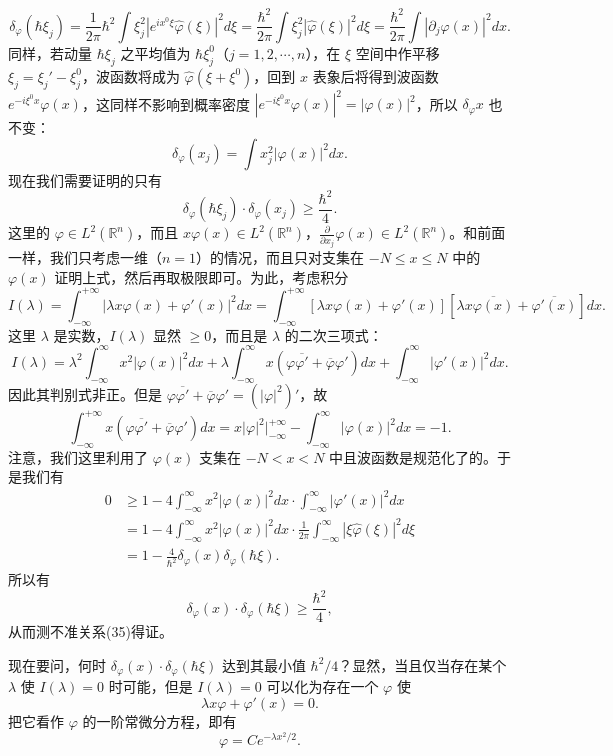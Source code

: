 \[
 \delta_\varphi(\hbar\xi_j)
 =\frac1{2\pi}\hbar^2\int\xi_j^2|e^{ix^0\xi}\widehat\varphi(\xi)|^2d\xi
 =\frac{\hbar^2}{2\pi}\int\xi_j^2|\widehat\varphi(\xi)|^2d\xi
 =\frac{\hbar^2}{2\pi}\int|\partial_j\varphi(x)|^2dx.
\]
同样，若动量 $\hbar\xi_j$ 之平均值为 $\hbar\xi_j^0$（$j=1,2,\cdots,n$），在 $\xi$ 空间中作平移 $\xi_j=\xi_j'-\xi_j^0$，波函数将成为 $\widehat\varphi(\xi+\xi^0)$，回到 $x$ 表象后将得到波函数 $e^{-i\xi^0x}\varphi(x)$，这同样不影响到概率密度 $|e^{-i\xi^0x}\varphi(x)|^2=|\varphi(x)|^2$，所以 $\delta_\varphi x$ 也不变：
\[
 \delta_\varphi(x_j)=\int x_j^2|\varphi(x)|^2dx.
\]
现在我们需要证明的只有
\[
 \delta_\varphi(\hbar\xi_j)\cdot\delta_\varphi(x_j)\ge\frac{\hbar^2}{4}.
\]
这里的 $\varphi\in L^2(\mathbb R^n)$，而且 $x\varphi(x)\in L^2(\mathbb R^n)$，$\frac\partial{\partial x_j}\varphi(x)\in L^2(\mathbb R^n)$。和前面一样，我们只考虑一维（$n=1$）的情况，而且只对支集在 $-N\le x\le N$ 中的 $\varphi(x)$ 证明上式，然后再取极限即可。为此，考虑积分
\[
 I(\lambda)=\int_{-\infty}^{+\infty}|\lambda x\varphi(x)+\varphi'(x)|^2dx
 =\int_{-\infty}^{+\infty}[\lambda x\varphi(x)+\varphi'(x)]
 [\lambda x\overline{\varphi(x)}+\overline{\varphi'(x)}]dx.
\]
这里 $\lambda$ 是实数，$I(\lambda)$ 显然 $\ge0$，而且是 $\lambda$ 的二次三项式：
\[
 I(\lambda)=\lambda^2\int_{-\infty}^{\infty}x^2|\varphi(x)|^2dx
 +\lambda\int_{-\infty}^{\infty}x(\varphi\overline{\varphi'}+\overline\varphi\varphi')dx
 +\int_{-\infty}^{\infty}|\varphi'(x)|^2dx.
\]
因此其判别式非正。但是 $\varphi\overline{\varphi'}+\overline\varphi\varphi'=(|\varphi|^2)'$，故
\[
 \int_{-\infty}^{+\infty}x(\varphi\overline{\varphi'}+\overline\varphi\varphi')dx
 =x|\varphi|^2\Big|_{-\infty}^{+\infty}-\int_{-\infty}^{\infty}|\varphi(x)|^2dx=-1.
\]
注意，我们这里利用了 $\varphi(x)$ 支集在 $-N<x<N$ 中且波函数是规范化了的。于是我们有
\[
 \begin{aligned}
 0&\ge1-4\int_{-\infty}^{\infty}x^2|\varphi(x)|^2dx\cdot
 \int_{-\infty}^{\infty}|\varphi'(x)|^2dx\\
 &=1-4\int_{-\infty}^{\infty}x^2|\varphi(x)|^2dx\cdot
 \frac1{2\pi}\int_{-\infty}^{\infty}|\xi\widehat\varphi(\xi)|^2d\xi\\
 &=1-\frac4{\hbar^2}\delta_\varphi(x)\delta_\varphi(\hbar\xi).
 \end{aligned}
\]
所以有
\[
 \delta_\varphi(x)\cdot\delta_\varphi(\hbar\xi)\ge\frac{\hbar^2}{4},
\]
从而测不准关系(35)得证。

现在要问，何时 $\delta_\varphi(x)\cdot\delta_\varphi(\hbar\xi)$ 达到其最小值 $\hbar^2/4$？显然，当且仅当存在某个 $\lambda$ 使 $I(\lambda)=0$ 时可能，但是 $I(\lambda)=0$ 可以化为存在一个 $\varphi$ 使
\[
 \lambda x\varphi+\varphi'(x)=0.
\]
把它看作 $\varphi$ 的一阶常微分方程，即有
\[
 \varphi=Ce^{-\lambda x^2/2}.
\]

